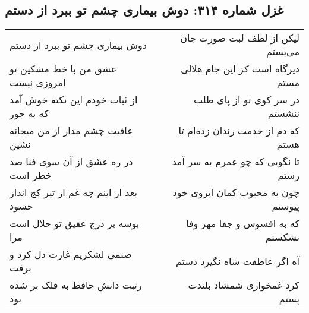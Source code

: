 \begin{center}
\section*{غزل شماره ۳۱۴: دوش بیماری چشم تو ببرد از دستم}
\label{sec:sh314}
\begin{longtable}{l p{0.5cm} r}
دوش بیماری چشم تو ببرد از دستم
&&
لیکن از لطف لبت صورت جان می‌بستم
\\
عشق من با خط مشکین تو امروزی نیست
&&
دیرگاه است کز این جام هلالی مستم
\\
از ثبات خودم این نکته خوش آمد که به جور
&&
در سر کوی تو از پای طلب ننشستم
\\
عافیت چشم مدار از من میخانه نشین
&&
که دم از خدمت رندان زده‌ام تا هستم
\\
در ره عشق از آن سوی فنا صد خطر است
&&
تا نگویی که چو عمرم به سر آمد رستم
\\
بعد از اینم چه غم از تیر کج انداز حسود
&&
چون به محبوب کمان ابروی خود پیوستم
\\
بوسه بر درج عقیق تو حلال است مرا
&&
که به افسوس و جفا مهر وفا نشکستم
\\
صنمی لشکریم غارت دل کرد و برفت
&&
آه اگر عاطفت شاه نگیرد دستم
\\
رتبت دانش حافظ به فلک بر شده بود
&&
کرد غمخواری شمشاد بلندت پستم
\\
\end{longtable}
\end{center}
